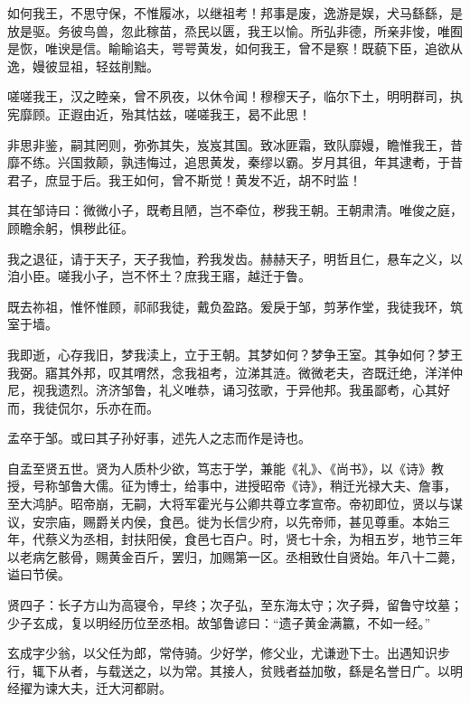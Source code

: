 \documentclass[12pt,UTF8]{ctexbook}
\begin{document}
如何我王，不思守保，不惟履冰，以继祖考！邦事是废，逸游是娱，犬马繇繇，是放是驱。务彼鸟兽，忽此稼苗，烝民以匮，我王以愉。所弘非德，所亲非悛，唯囿是恢，唯谀是信。睮睮谄夫，咢咢黄发，如何我王，曾不是察！既藐下臣，追欲从逸，嫚彼显祖，轻兹削黜。



嗟嗟我王，汉之睦亲，曾不夙夜，以休令闻！穆穆天子，临尔下土，明明群司，执宪靡顾。正遐由近，殆其怙兹，嗟嗟我王，曷不此思！



非思非鉴，嗣其罔则，弥弥其失，岌岌其国。致冰匪霜，致队靡嫚，瞻惟我王，昔靡不练。兴国救颠，孰违悔过，追思黄发，秦缪以霸。岁月其徂，年其逮耇，于昔君子，庶显于后。我王如何，曾不斯觉！黄发不近，胡不时监！



其在邹诗曰：微微小子，既耇且陋，岂不牵位，秽我王朝。王朝肃清。唯俊之庭，顾瞻余躬，惧秽此征。



我之退征，请于天子，天子我恤，矜我发齿。赫赫天子，明哲且仁，悬车之义，以洎小臣。嗟我小子，岂不怀土？庶我王寤，越迁于鲁。



既去祢祖，惟怀惟顾，祁祁我徒，戴负盈路。爰戾于邹，剪茅作堂，我徒我环，筑室于墙。



我即逝，心存我旧，梦我渎上，立于王朝。其梦如何？梦争王室。其争如何？梦王我弼。寤其外邦，叹其喟然，念我祖考，泣涕其涟。微微老夫，咨既迁绝，洋洋仲尼，视我遗烈。济济邹鲁，礼义唯恭，诵习弦歌，于异他邦。我虽鄙耇，心其好而，我徒侃尔，乐亦在而。



孟卒于邹。或曰其子孙好事，述先人之志而作是诗也。



自孟至贤五世。贤为人质朴少欲，笃志于学，兼能《礼》、《尚书》，以《诗》教授，号称邹鲁大儒。征为博士，给事中，进授昭帝《诗》，稍迁光禄大夫、詹事，至大鸿胪。昭帝崩，无嗣，大将军霍光与公卿共尊立孝宣帝。帝初即位，贤以与谋议，安宗庙，赐爵关内侯，食邑。徙为长信少府，以先帝师，甚见尊重。本始三年，代蔡义为丞相，封扶阳侯，食邑七百户。时，贤七十余，为相五岁，地节三年以老病乞骸骨，赐黄金百斤，罢归，加赐第一区。丞相致仕自贤始。年八十二薨，谥曰节侯。



贤四子：长子方山为高寝令，早终；次子弘，至东海太守；次子舜，留鲁守坟墓；少子玄成，复以明经历位至丞相。故邹鲁谚曰：“遗子黄金满籝，不如一经。”



玄成字少翁，以父任为郎，常侍骑。少好学，修父业，尤谦逊下士。出遇知识步行，辄下从者，与载送之，以为常。其接人，贫贱者益加敬，繇是名誉日广。以明经擢为谏大夫，迁大河都尉。
\end{document}
